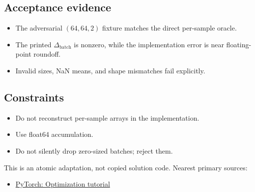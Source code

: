         \subsection{Acceptance evidence}

        \begin{evidencebox}
        \begin{itemize}
          \item The adversarial $(64,64,2)$ fixture matches the direct per-sample oracle.
  \item The printed \(\Delta_{\mathrm{batch}}\) is nonzero, while the implementation error is near floating-point roundoff.
  \item Invalid sizes, NaN means, and shape mismatches fail explicitly.
        \end{itemize}
        \end{evidencebox}

        \subsection{Constraints}

        \begin{itemize}
          \item Do not reconstruct per-sample arrays in the implementation.
  \item Use float64 accumulation.
  \item Do not silently drop zero-sized batches; reject them.
        \end{itemize}

        \begin{sourcebox}
        This is an atomic adaptation, not copied solution code. Nearest primary sources:
        \begin{itemize}
          \item \href{https://docs.pytorch.org/tutorials/beginner/basics/optimization_tutorial.html}{PyTorch: Optimization tutorial}
        \end{itemize}
        \end{sourcebox}
